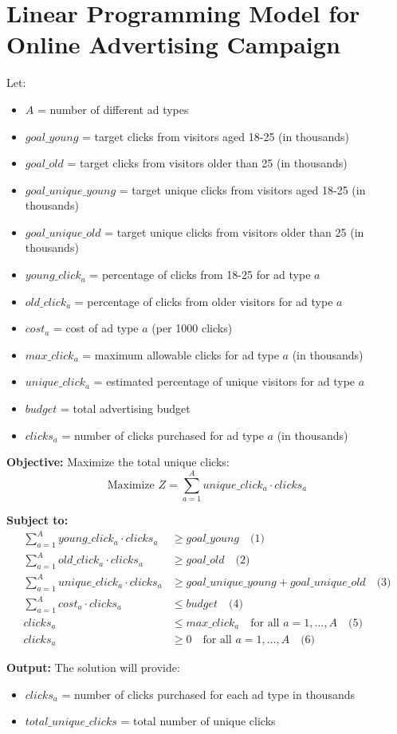 \documentclass{article}
\begin{document}
\section*{Linear Programming Model for Online Advertising Campaign}

Let:
\begin{itemize}
    \item \( A \) = number of different ad types
    \item \( goal\_young \) = target clicks from visitors aged 18-25 (in thousands)
    \item \( goal\_old \) = target clicks from visitors older than 25 (in thousands)
    \item \( goal\_unique\_young \) = target unique clicks from visitors aged 18-25 (in thousands)
    \item \( goal\_unique\_old \) = target unique clicks from visitors older than 25 (in thousands)
    \item \( young\_click_a \) = percentage of clicks from 18-25 for ad type \( a \)
    \item \( old\_click_a \) = percentage of clicks from older visitors for ad type \( a \)
    \item \( cost_a \) = cost of ad type \( a \) (per 1000 clicks)
    \item \( max\_click_a \) = maximum allowable clicks for ad type \( a \) (in thousands)
    \item \( unique\_click_a \) = estimated percentage of unique visitors for ad type \( a \)
    \item \( budget \) = total advertising budget
    \item \( clicks_a \) = number of clicks purchased for ad type \( a \) (in thousands)
\end{itemize}

\textbf{Objective:}
Maximize the total unique clicks:
\[
\text{Maximize } Z = \sum_{a=1}^{A} unique\_click_a \cdot clicks_a
\]

\textbf{Subject to:}
\begin{align*}
\sum_{a=1}^{A} young\_click_a \cdot clicks_a & \geq goal\_young \quad \text{(1)} \\
\sum_{a=1}^{A} old\_click_a \cdot clicks_a & \geq goal\_old \quad \text{(2)} \\
\sum_{a=1}^{A} unique\_click_a \cdot clicks_a & \geq goal\_unique\_young + goal\_unique\_old \quad \text{(3)} \\
\sum_{a=1}^{A} cost_a \cdot clicks_a & \leq budget \quad \text{(4)} \\
clicks_a & \leq max\_click_a \quad \text{for all } a = 1, \ldots, A \quad \text{(5)} \\
clicks_a & \geq 0 \quad \text{for all } a = 1, \ldots, A \quad \text{(6)}
\end{align*}

\textbf{Output:}
The solution will provide:
\begin{itemize}
    \item \( clicks_a \) = number of clicks purchased for each ad type in thousands
    \item \( total\_unique\_clicks \) = total number of unique clicks
\end{itemize}
\end{document}
